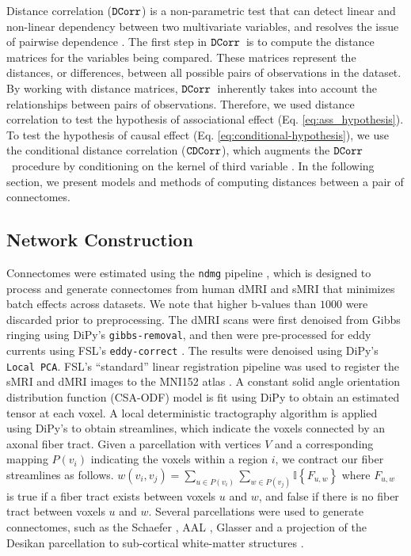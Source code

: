 Distance correlation ($\operatorname{\mathtt{DCorr}}$) is a non-parametric test that can detect linear and non-linear dependency between two multivariate variables, and resolves the issue of pairwise dependence \cite{szekely2007measuring, szekely2014partial}. The first step in $\operatorname{\mathtt{DCorr}}$\ is to compute the distance matrices for the variables being compared. These matrices represent the distances, or differences, between all possible pairs of observations in the dataset. By working with distance matrices, $\operatorname{\mathtt{DCorr}}$\ inherently takes into account the relationships between pairs of observations. Therefore, we used distance correlation to test the hypothesis of associational effect (Eq. \ref{eq:ass_hypothesis}). To test the hypothesis of causal effect (Eq. \ref{eq:conditional-hypothesis}), we use the conditional distance correlation ($\operatorname{\mathtt{CDCorr}}$), which augments the $\operatorname{\mathtt{DCorr}}$\ procedure by conditioning on the kernel of third variable \cite{wang2015conditional}. In the following section, we present models and methods of computing distances between a pair of connectomes. 

\subsection{Network Construction} \label{sec:network_construction}
Connectomes were estimated using the \texttt{ndmg} pipeline \cite{Kiar188706}, which is designed to process and generate connectomes from human dMRI and sMRI that minimizes batch effects across datasets. We note that higher b-values than $1000$ were discarded prior to preprocessing. The dMRI scans were first denoised from Gibbs ringing using DiPy's \texttt{gibbs-removal}, and then were pre-processed for eddy currents using FSL's \texttt{eddy-correct} \cite{fsl1}. The results were denoised using DiPy's \texttt{Local PCA}. FSL's ``standard'' linear registration pipeline was used to register the sMRI and dMRI images to the MNI152 atlas \cite{fsl1,fsl2,fsl3,mni152}. A constant solid angle orientation distribution function (CSA-ODF) model is fit using DiPy \cite{dipy} to obtain an estimated tensor at each voxel. A local deterministic tractography algorithm is applied using DiPy's \cite{dipy} to obtain streamlines, which indicate the voxels connected by an axonal fiber tract. Given a parcellation with vertices $V$ and a corresponding mapping $P(v_i)$ indicating the voxels within a region $i$, we contract our fiber streamlines as follows. $w(v_i, v_j) = \sum_{u \in P(v_i)}\sum_{w \in P(v_j)} \mathbb{I}\left\{ F_{u, w} \right\}$ where $F_{u, w}$ is true if a fiber tract exists between voxels $u$ and $w$, and false if there is no fiber tract between voxels $u$ and $w$. Several parcellations were used to generate connectomes, such as the Schaefer \cite{schaefer2018local}, AAL \cite{tzourio2002automated}, Glasser \cite{glasser2016multi} and a projection of the Desikan parcellation \cite{desikan2006automated} to sub-cortical white-matter structures \cite{Lawrence2021Mar}.

